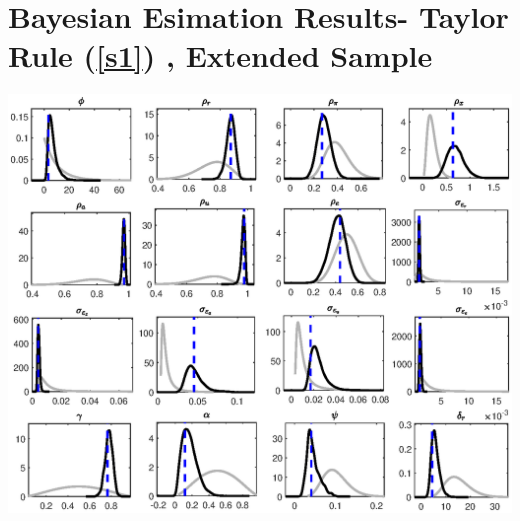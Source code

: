 \documentclass[11pt,preprint, authoryear]{elsarticle}
\let\origfigure\figure
\let\endorigfigure\endfigure
\renewenvironment{figure}[1][2] {
    \expandafter\origfigure\expandafter[H]
} {
    \endorigfigure
}
\numberwithin{equation}{section}
\numberwithin{figure}{section}
\numberwithin{table}{section}
\begin{document}
\newpage
\renewcommand{\thesection}{Appendix B}

\hypertarget{bayesian-esimation-results--taylor-rule-extended-sample}{%
\section{\texorpdfstring{Bayesian Esimation Results- Taylor Rule
(\ref{s1}) , Extended Sample
\label{bb}}{Bayesian Esimation Results- Taylor Rule () , Extended Sample }}\label{bayesian-esimation-results--taylor-rule-extended-sample}}

\begin{figure}
     \centering
     \includegraphics[height=0.4\textheight]{code/posterior_extended.eps}
    \caption{Estimated posterior distributions (black solid line) for the extended sample under the Taylor rule. The grey line shows the prior density and the black line the density of the posterior distribution. The blue horizontal line indicates the posterior mode.}
        \label{posterior_extended1}
\end{figure}
\end{document}
